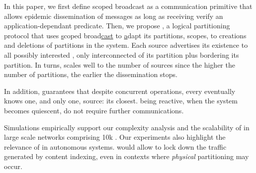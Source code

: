 In this paper, we first define scoped broadcast as a communication
primitive that allows epidemic dissemination of messages as long as
receiving \processes verify an application-dependant predicate.  Then,
we propose \emph{\NAME}, a logical partitioning protocol that uses
\underline{s}coped broad\underline{cast} to \underline{a}dapt its
partitions, \ie scopes, to creations and deletions of partitions in
the system. Each source advertises its existence to all possibly
interested \processes, \ie only interconnected \processes of its
partition plus \processes bordering its partition. In turns, \NAME
scales well to the number of sources since the higher the number of
partitions, the earlier the dissemination stops.
%
%

\noindent In addition, \NAME guarantees that despite concurrent
operations, every \process eventually knows one, and only one, source:
its closest. \NAME being reactive, when the system becomes quiescent,
\processes do not require further communications.

\noindent Simulations empirically support our complexity analysis and
the scalability of \NAME in large scale networks comprising 10k
\processes. Our experiments also highlight the relevance of \NAME in
autonomous systems. \NAME would allow to lock down the traffic
generated by content indexing, even in contexts where \emph{physical}
partitioning may occur.

